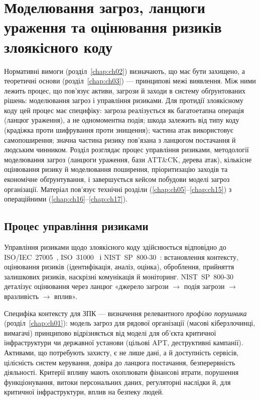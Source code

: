 \chapter{Моделювання загроз, ланцюги ураження та оцінювання ризиків злоякісного коду}
\label{chap:ch04}

Нормативні вимоги (розділ~\ref{chap:ch02}) визначають, що має бути захищено, а теоретичні основи (розділ~\ref{chap:ch03}) --- принципові межі виявлення. Між ними лежить процес, що пов'язує активи, загрози й заходи в систему обґрунтованих рішень: моделювання загроз і управління ризиками. Для протидії злоякісному коду цей процес має специфіку: загроза реалізується як багатоетапна операція (ланцюг ураження), а не одномоментна подія; шкода залежить від типу коду (крадіжка проти шифрування проти знищення); частина атак використовує самопоширення; значна частина ризику пов'язана з ланцюгом постачання й людським чинником. Розділ розглядає процес управління ризиками, методології моделювання загроз (ланцюги ураження, бази ATT\&CK, дерева атак), кількісне оцінювання ризику й моделювання поширення, пріоритизацію заходів та економічне обґрунтування, і завершується кейсом побудови моделі загроз організації. Матеріал пов'язує технічні розділи (\ref{chap:ch05}--\ref{chap:ch15}) з операційними (\ref{chap:ch16}--\ref{chap:ch17}).

\section{Процес управління ризиками}\label{sec:ch04-process}

Управління ризиками щодо злоякісного коду здійснюється відповідно до ISO/IEC~27005~\cite{iso-27005}, ISO~31000~\cite{iso-31000} і NIST~SP~800-30~\cite{ch04:nist30}: встановлення контексту, оцінювання ризиків (ідентифікація, аналіз, оцінка), оброблення, прийняття залишкових ризиків, наскрізні комунікація й моніторинг. NIST~SP~800-30 деталізує оцінювання через ланцюг «джерело загрози $\to$ подія загрози $\to$ вразливість $\to$ вплив».

Специфіка контексту для ЗПК --- визначення релевантного \emph{профілю порушника} (розділ~\ref{chap:ch01}): модель загроз для рядової організації (масові кіберзлочинці, вимагачі) принципово відрізняється від моделі для об'єкта критичної інфраструктури чи державної установи (цільові APT, деструктивні кампанії). Активами, що потребують захисту, є не лише дані, а й доступність сервісів, цілісність систем керування, довіра до ланцюга постачання, безперервність діяльності. Критерії впливу мають охоплювати фінансові втрати, порушення функціонування, витоки персональних даних, регуляторні наслідки й, для критичної інфраструктури, вплив на безпеку людей.

